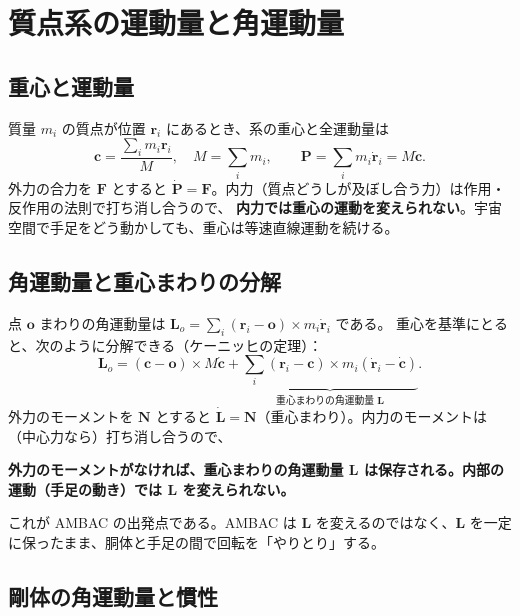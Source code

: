 \section{質点系の運動量と角運動量}

\subsection{重心と運動量}

質量 $m_i$ の質点が位置 $\bm r_i$ にあるとき、系の重心と全運動量は
\begin{equation}
\bm c = \frac{\sum_i m_i\bm r_i}{M},\quad M=\sum_i m_i,\qquad \bm P = \sum_i m_i\dot{\bm r}_i = M\dot{\bm c}.
\end{equation}
外力の合力を $\bm F$ とすると $\dot{\bm P} = \bm F$。内力（質点どうしが及ぼし合う力）は作用・反作用の法則で打ち消し合うので、
\textbf{内力では重心の運動を変えられない}。宇宙空間で手足をどう動かしても、重心は等速直線運動を続ける。

\subsection{角運動量と重心まわりの分解}

点 $\bm o$ まわりの角運動量は $\bm L_o = \sum_i (\bm r_i-\bm o)\times m_i\dot{\bm r}_i$ である。
重心を基準にとると、次のように分解できる（ケーニッヒの定理）：
\begin{equation}
\bm L_o = (\bm c-\bm o)\times M\dot{\bm c} + \underbrace{\sum_i (\bm r_i-\bm c)\times m_i(\dot{\bm r}_i-\dot{\bm c})}_{\text{重心まわりの角運動量 }\bm L}.
\end{equation}
外力のモーメントを $\bm N$ とすると $\dot{\bm L} = \bm N$（重心まわり）。内力のモーメントは（中心力なら）打ち消し合うので、
\begin{keypoint}
\textbf{外力のモーメントがなければ、重心まわりの角運動量 $\bm L$ は保存される。内部の運動（手足の動き）では $\bm L$ を変えられない。}
\end{keypoint}
これが AMBAC の出発点である。AMBAC は $\bm L$ を変えるのではなく、$\bm L$ を一定に保ったまま、胴体と手足の間で回転を「やりとり」する。

\subsection{剛体の角運動量と慣性}

